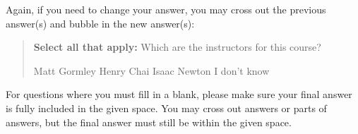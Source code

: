 \documentclass[11pt,addpoints,answers]{exam}
\begin{document}
Again, if you need to change your answer, you may cross out the previous answer(s) and bubble in the new answer(s):

\begin{quote}
\textbf{Select all that apply:} Which are the instructors for this course?
    {%
    \checkboxchar{\xcancel{$\blacksquare$}} \checkedchar{$\blacksquare$} %
    \begin{checkboxes}
    \CorrectChoice Matt Gormley 
    \CorrectChoice Henry Chai
    \choice Isaac Newton
    \choice I don't know
    \end{checkboxes}
    }
\end{quote}

For questions where you must fill in a blank, please make sure your final answer is fully included in the given space. You may cross out answers or parts of answers, but the final answer must still be within the given space.
\end{document}

